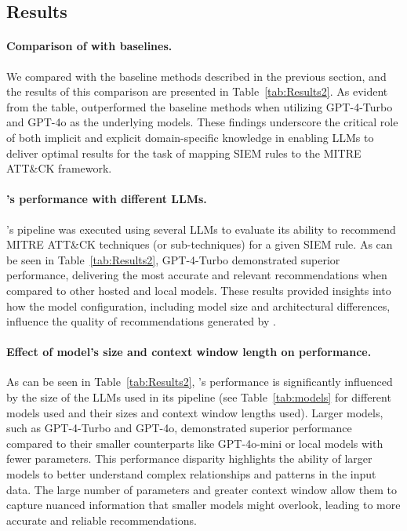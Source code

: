 \subsection{Results}

\paragraph{\textbf{Comparison of \methodName with baselines.}}
We compared \methodName with the baseline methods described in the previous section, and the results of this comparison are presented in Table~\ref{tab:Results2}. 
As evident from the table, \methodName outperformed the baseline methods when utilizing GPT-4-Turbo and GPT-4o as the underlying models. 
These findings underscore the critical role of both implicit and explicit domain-specific knowledge in enabling LLMs to deliver optimal results for the task of mapping SIEM rules to the MITRE ATT\&CK framework.

\paragraph{\textbf{\methodName's performance with different LLMs.}}
\methodName's pipeline  was executed using several LLMs to evaluate its ability to recommend MITRE ATT\&CK techniques (or sub-techniques) for a given SIEM rule. 
As can be seen in Table~\ref{tab:Results2}, GPT-4-Turbo demonstrated superior performance, delivering the most accurate and relevant recommendations when compared to other hosted and local models. 
These results provided insights into how the model configuration, including model size and architectural differences, influence the quality of recommendations generated by \methodName.


\paragraph{\textbf{Effect of model's size and context window length on performance.}}
As can be seen in Table~\ref{tab:Results2}, \methodName's performance is significantly influenced by the size of the LLMs used in its pipeline (see Table~\ref{tab:models} for different models used and their sizes and context window lengths used).
Larger models, such as GPT-4-Turbo and GPT-4o, demonstrated superior performance compared to their smaller counterparts like GPT-4o-mini or local models with fewer parameters.
This performance disparity highlights the ability of larger models to better understand complex relationships and patterns in the input data. 
The large number of parameters and greater context window allow them to capture nuanced information that smaller models might overlook, leading to more accurate and reliable recommendations.


